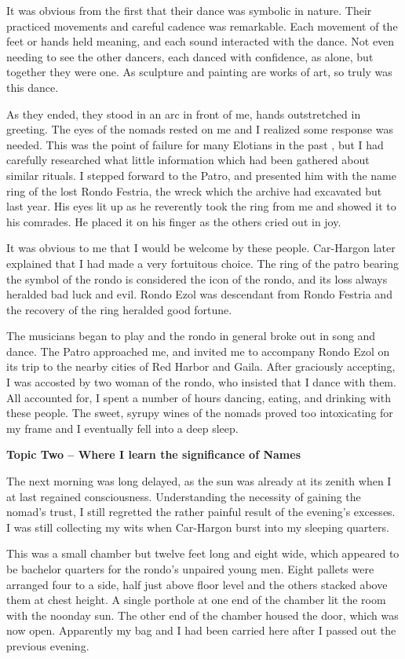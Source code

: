 \begin{multicols*}{2}
It was obvious from the first that their dance was symbolic in nature. Their practiced movements and careful cadence was remarkable. Each movement of the feet or hands held meaning, and each sound interacted with the dance. Not even needing to see the other dancers, each danced with confidence, as alone, but together they were one. As sculpture and painting are works of art, so truly was this dance.

As they ended, they stood in an arc in front of me, hands outstretched in greeting. The eyes of the nomads rested on me and I realized some response was needed. This was the point of failure for many Elotians in the past , but I had carefully researched what little information which had been gathered about similar rituals. I stepped forward to the Patro, and presented him with the name ring of the lost Rondo Festria, the wreck which the archive had excavated but last year. His eyes lit up as he reverently took the ring from me and showed it to his comrades. He placed it on his finger as the others cried out in joy.

It was obvious to me that I would be welcome by these people. Car-Hargon later explained that I had made a very fortuitous choice. The ring of the patro bearing the symbol of the rondo is considered the icon of the rondo, and its loss always heralded bad luck and evil. Rondo Ezol was descendant from Rondo Festria and the recovery of the ring heralded good fortune.

The musicians began to play and the rondo in general broke out in song and dance. The Patro approached me, and invited me to accompany Rondo Ezol on its trip to the nearby cities of Red Harbor and Gaila. After graciously accepting, I was accosted by two woman of the rondo, who insisted that I dance with them. All accounted for, I spent a number of hours dancing, eating, and drinking with these people. The sweet, syrupy wines of the nomads proved too intoxicating for my frame and I eventually fell into a deep sleep.

\textbf{Topic Two – Where I learn the significance of Names}

The next morning was long delayed, as the sun was already at its zenith when I at last regained consciousness. Understanding the necessity of gaining the nomad's trust, I still regretted the rather painful result of the evening's excesses. I was still collecting my wits when Car-Hargon burst into my sleeping quarters.

This was a small chamber but twelve feet long and eight wide, which appeared to be bachelor quarters for the rondo's unpaired young men. Eight pallets were arranged four to a side, half just above floor level and the others stacked above them at chest height. A single porthole at one end of the chamber lit the room with the noonday sun. The other end of the chamber housed the door, which was now open. Apparently my bag and I had been carried here after I passed out the previous evening.


\end{multicols*}
